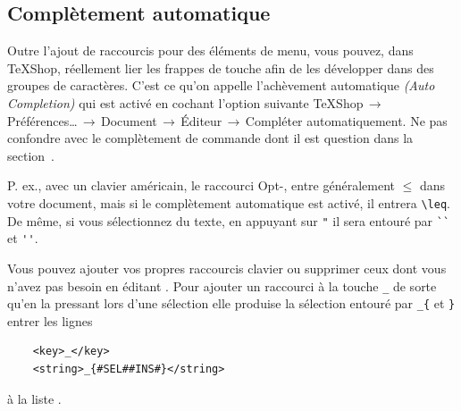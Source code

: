 \documentclass[11pt,french]{article}
\newcommand{\TS}{\textsf{\TeX Shop}}
\newcommand{\cmd}[1]{\textsf{#1}}
\newcommand{\mnu}[1]{\textsf{#1}}
\newcommand{\To}{\,\(\to\)\,}
\begin{document}

\subsection{Complètement automatique}

Outre l'ajout de raccourcis pour des éléments de menu, vous pouvez, dans \TS{}, réellement lier les frappes de touche afin de les développer dans des groupes de caractères. C'est ce qu'on appelle l'achèvement automatique \emph{(Auto Completion)} qui est activé en cochant l'option suivante \mnu{TeXShop}\To\mnu{Préférences…}\To\mnu{Document}\To\mnu{Éditeur}\To\mnu{Compléter automatiquement}. Ne pas confondre avec le complètement de commande dont il est question dans la section~.%

P. ex., avec un clavier américain, le raccourci \cmd{Opt-,} entre généralement \texttt{\(\leq\)} dans votre document, mais si le complètement automatique est activé, il entrera \verb|\leq|. De même, si vous sélectionnez du texte, en appuyant sur \verb|"| il sera entouré par \verb|``| et \verb|''|.

Vous pouvez ajouter vos propres raccourcis clavier ou supprimer ceux dont vous n'avez pas besoin en éditant . Pour ajouter un raccourci à la touche \verb|_| de sorte qu'en la pressant lors d'une sélection elle produise la sélection entouré par \verb|_{| et \verb|}| entrer les lignes
\begin{verbatim}
	<key>_</key>
	<string>_{#SEL##INS#}</string>
\end{verbatim}
à la liste .

%
\end{document}
